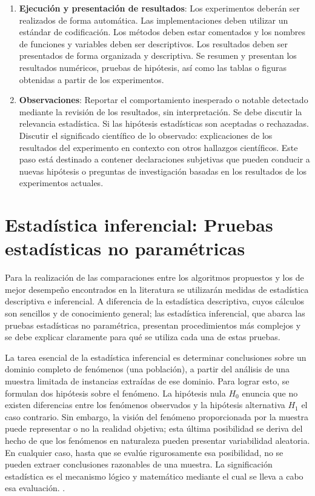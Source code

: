 \begin{enumerate}[label=Paso \arabic*. , leftmargin=2cm]
	\item \textbf{Ejecución y presentación de resultados}: Los experimentos deberán ser realizados de forma automática. Las implementaciones deben utilizar un estándar de codificación. Los métodos deben estar comentados y los nombres de funciones y variables deben ser descriptivos. Los resultados deben ser presentados de forma organizada y descriptiva. Se resumen y presentan los resultados numéricos, pruebas de hipótesis, así como las tablas o figuras obtenidas a partir de los experimentos.
	\item \textbf{Observaciones}: Reportar el comportamiento inesperado o notable detectado mediante la revisión de los resultados, sin interpretación. Se debe discutir la relevancia estadística. Si las hipótesis estadísticas son aceptadas o rechazadas. Discutir el significado científico de lo observado: explicaciones de los resultados del experimento en contexto con otros hallazgos científicos. Este paso está destinado a contener declaraciones subjetivas que pueden conducir a nuevas hipótesis o preguntas de investigación basadas en los resultados de los experimentos actuales.
\end{enumerate}

\section{Estadística inferencial: Pruebas estadísticas no paramétricas}
Para la realización de las comparaciones entre los algoritmos propuestos y los de mejor desempeño encontrados en la literatura se utilizarán medidas de estadística  descriptiva e inferencial. A diferencia de la estadística descriptiva, cuyos cálculos son sencillos y de conocimiento general; las estadística inferencial, que abarca las pruebas estadísticas no paramétrica, presentan procedimientos más complejos y se debe explicar claramente para qué se utiliza cada una de estas pruebas.

La tarea esencial de la estadística inferencial es determinar conclusiones sobre un dominio completo de fenómenos (una población), a partir del análisis de una muestra limitada de instancias extraídas de ese dominio. Para lograr esto, se formulan dos hipótesis sobre el fenómeno. La hipótesis nula $H_0$ enuncia que no existen diferencias entre los fenómenos observados y la hipótesis alternativa $H_1$  el caso contrario. Sin embargo, la visión del fenómeno proporcionada por la muestra puede representar o no la realidad objetiva; esta última posibilidad se deriva del hecho de que los fenómenos en naturaleza pueden presentar variabilidad aleatoria. En cualquier caso, hasta que se evalúe rigurosamente esa posibilidad, no se pueden extraer conclusiones razonables de una muestra. La significación estadística es el mecanismo lógico y matemático mediante el cual se lleva a cabo esa evaluación. \cite{Lowry2004}.

